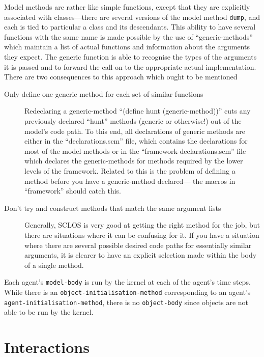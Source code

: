 Model methods are rather like simple functions, except that they are
explicitly associated with classes---there are several versions of
the model method \texttt{dump}, and each is tied to particular a class
and its descendants.  This ability to have several functions with the same
name is made possible by the use of ``generic-methods'' which
maintain a list of actual functions and information about the
arguments they expect.  The generic function is able to 
recognise the types of the arguments it is passed and to forward the
call on to the appropriate actual implementation.  There are two
consequences to this approach which ought to be mentioned
\begin{description}
  \item[Only define one generic method for each set of similar
    functions] Redeclaring a generic-method ``(define hunt
    (generic-method))'' cuts any previously declared ``hunt'' methods
    (generic or otherwise!) out of the model's code path. To this end,
    all declarations of generic methods are either in the
    ``declarations.scm'' file, which contains the declarations for
    most of the model-methods or in the ``framework-declarations.scm''
    file which declares the generic-methods for methods required by
    the lower levels of the framework.  Related to this is the problem
    of defining a method before you have a generic-method declared---
    the macros in ``framework'' should catch this.
  \item[Don't try and construct methods that match the same argument
    lists] Generally, \textsf{SCLOS} is very good at getting the right
    method for the job, but there are situations where it can be
    confusing for it.  If you have a situation where there are several
    possible desired code paths for essentially similar arguments, it
    is clearer to have an explicit selection made within the body of a
    single method.
\end{description}
 
Each agent's \texttt{model-body} is run by the kernel at each of the
agent's time steps. While there is an
\texttt{object-initialisation-method} corresponding to an agent's
\texttt{agent-initialisation-method}, there is no \texttt{object-body}
since objects are not able to be run by the kernel.

\section{Interactions}\label{interactions}


